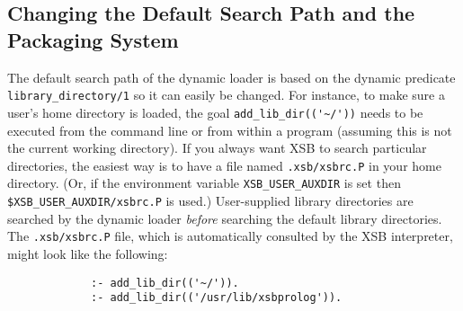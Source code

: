\subsection{Changing the Default Search Path and the Packaging System}
The default search path of the dynamic loader is based on the dynamic
predicate {\tt library\_directory/1} so it can easily be changed.  For
instance, to make sure a user's home directory is loaded, the goal
\verb|add_lib_dir(('~/'))|  needs to be executed from the
command line or from within a program (assuming this is not the
current working directory).  If you always want XSB to search
particular directories, the easiest way is to have a file named
{\verb|.xsb/xsbrc.P|} in your home directory.
(Or, if the environment variable \texttt{XSB\_USER\_AUXDIR} is set then
{\verb|$XSB_USER_AUXDIR/xsbrc.P|} is used.)
User-supplied library
directories are searched by the dynamic loader {\em before} searching
the default library directories.  The {\verb|.xsb/xsbrc.P|} file,
which is automatically consulted by the XSB interpreter, might look
like the following:
\begin{verbatim}
             :- add_lib_dir(('~/')).
             :- add_lib_dir(('/usr/lib/xsbprolog')).
\end{verbatim}


